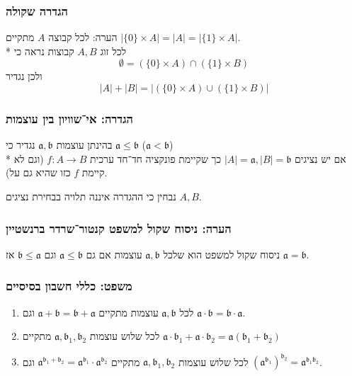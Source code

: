 \subsubsection{הגדרה שקולה}
הערה: לכל קבוצה $A$ מתקיים $|\{0\} \times A| = |A| = |\{1\} \times A|$. \\*
לכל זוג $A, B$ קבוצות נראה כי
\[
	\emptyset = (\{ 0 \} \times A) \cap (\{ 1 \} \times B)
\]
ולכן נגדיר
\[
	|A| + |B| = |(\{ 0 \} \times A) \cup (\{ 1 \} \times B)|
\]

\subsubsection{הגדרה: אי־שוויון בין עוצמות}
בהינתן עוצמות $\mathfrak{a}, \mathfrak{b}$ נגדיר כי $\mathfrak{a} \le \mathfrak{b}$ ($\mathfrak{a} < \mathfrak{b}$) \\*
אם יש נציגים $|A| = \mathfrak{a}, |B| = \mathfrak{b}$ כך שקיימת פונקציה חד־חד ערכית $f : A \to B$ (וגם לא קיימת $f$ כזו שהיא גם על).

נבחין כי ההגדרה איננה תלויה בבחירת נציגים $A, B$.

\subsubsection{הערה: ניסוח שקול למשפט קנטור־שרדר ברנשטיין}
ניסוח שקול למשפט הוא שלכל $\mathfrak{a}, \mathfrak{b}$ עוצמות אם גם $\mathfrak{a} \le \mathfrak{b}$ וגם $\mathfrak{b} \le \mathfrak{a}$ אז $\mathfrak{a} = \mathfrak{b}$.

\subsubsection{משפט: כללי חשבון בסיסיים}
\begin{enumerate}
	\item לכל $\mathfrak{a}, \mathfrak{b}$ עוצמות מתקיים $\mathfrak{a} + \mathfrak{b} = \mathfrak{b} + \mathfrak{a}$ וגם $\mathfrak{a} \cdot \mathfrak{b} = \mathfrak{b} \cdot \mathfrak{a}$.
	\item לכל שלוש עוצמות $\mathfrak{a}, \mathfrak{b}_1, \mathfrak{b}_2$ מתקיים $\mathfrak{a} \cdot \mathfrak{b}_1 + \mathfrak{a} \cdot \mathfrak{b}_2 = \mathfrak{a}(\mathfrak{b}_1 + \mathfrak{b}_2)$
	\item לכל שלוש עוצמות $\mathfrak{a}, \mathfrak{b}_1, \mathfrak{b}_2$ מתקיים $\mathfrak{a}^{\mathfrak{b}_1 + \mathfrak{b}_2} = \mathfrak{a}^{\mathfrak{b}_1} \cdot \mathfrak{a}^{\mathfrak{b}_2}$
		וגם ${{(\mathfrak{a}^{\mathfrak{b}_1})}^{\mathfrak{b}_2}} = \mathfrak{a}^{\mathfrak{b}_1 \mathfrak{b}_2}$.
\end{enumerate}

